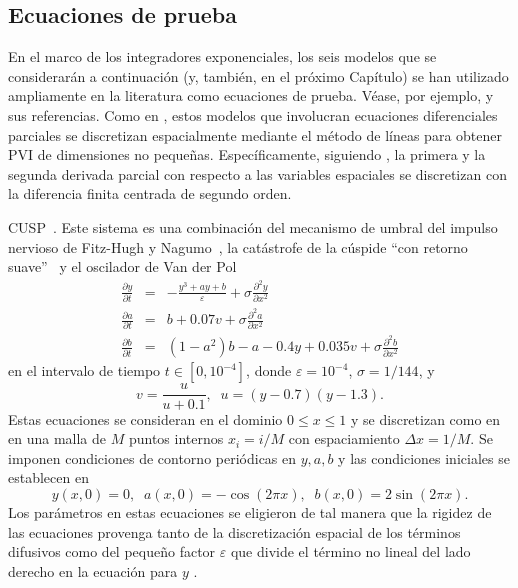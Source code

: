 \subsection{Ecuaciones de prueba}\label{section:test-eq}
En el marco de los integradores exponenciales, los seis modelos que se considerarán a continuación (y, también, en el próximo Capítulo) se han utilizado ampliamente en la literatura como ecuaciones de prueba. Véase, por ejemplo, \cite{tokman2006efficient,tokman2012new,tokman2013comparative} y sus referencias. Como en \cite{tokman2006efficient,tokman2012new,tokman2013comparative}, estos modelos que involucran ecuaciones diferenciales parciales se discretizan espacialmente mediante el método de líneas para obtener PVI de dimensiones no pequeñas. Específicamente, siguiendo \cite{tokman2006efficient,tokman2012new,tokman2013comparative}, la primera y la segunda derivada parcial con respecto a las variables espaciales se discretizan con la diferencia finita centrada de segundo orden.

\begin{example}
    \label{ex:cusp} CUSP~\cite{wanner1996solving,tokman2006efficient}. Este sistema es una combinación del mecanismo de umbral del impulso nervioso de Fitz-Hugh y Nagumo~\cite{fitzhugh1969mathematical,nagumo1962active}, la catástrofe de la cúspide ``con retorno suave''~\cite{zeeman1973differential} y el oscilador de Van der Pol
    \begin{eqnarray*}
        \frac{\partial y}{\partial t} &=& -\frac{y^{3}+ay+b}{\varepsilon}+\sigma\frac{\partial^{2}y}{\partial x^{2}}\\
        \frac{\partial a}{\partial t} &=& b+0\mathord{.}07v+\sigma \frac{\partial^{2}a}{\partial x^{2}}\\
        \frac{\partial b}{\partial t} &=& (1-a^{2})b-a-0\mathord{.}4y+0\mathord{.}035v+\sigma\frac{\partial^{2}b}{\partial x^{2}}
    \end{eqnarray*}
    en el intervalo de tiempo $t\in [0,10^{-4}]$, donde $\varepsilon=10^{-4}$, $\sigma=1/144$, y
    \[ v= \frac{u}{u+0\mathord{.}1},\;\; u=(y-0\mathord{.}7)(y-1\mathord{.}3).\]
    Estas ecuaciones se consideran en el dominio $0\leq x\leq 1$ y se discretizan como en \cite{tokman2006efficient} en una malla de $M$ puntos internos $x_i = i/M$ con espaciamiento $\Delta x=1/M$. Se imponen condiciones de contorno periódicas en $y,a,b$ y las condiciones iniciales se establecen en
    \[y(x, 0)=0,\;\;a(x, 0)=-\cos(2\pi x),\;\;b(x, 0)=2\sin(2\pi x).\]
    Los parámetros en estas ecuaciones se eligieron de tal manera que la rigidez de las ecuaciones provenga tanto de la discretización espacial de los términos difusivos como del pequeño factor $\varepsilon$ que divide el término no lineal del lado derecho en la ecuación para $y$ .
\end{example}

